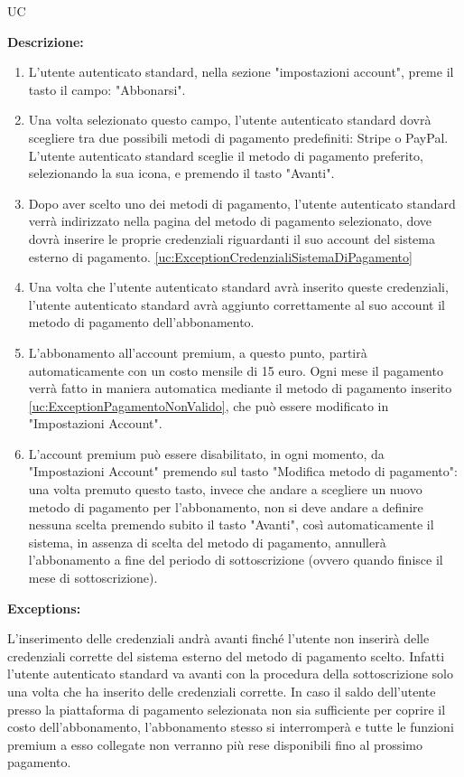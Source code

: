 \begin{listaPersonale}{UC}
\begin{listaPersonale2}[UC] {}
        \textbf{Descrizione:}
        \begin{enumerate}
            \item L'utente autenticato standard, nella sezione "impostazioni account", preme il tasto il campo: "Abbonarsi".
            \item Una volta selezionato questo campo, l'utente autenticato standard dovrà scegliere tra due possibili metodi di pagamento predefiniti: Stripe o PayPal. L'utente autenticato standard sceglie il metodo di pagamento preferito, selezionando la sua icona, e premendo il tasto "Avanti".
            \item Dopo aver scelto uno dei metodi di pagamento, l'utente autenticato standard verrà indirizzato nella pagina del metodo di pagamento selezionato, dove dovrà inserire le proprie credenziali riguardanti il suo account del sistema esterno di pagamento. \ref{uc:ExceptionCredenzialiSistemaDiPagamento}
            \item Una volta che l'utente autenticato standard avrà inserito queste credenziali, l'utente autenticato standard avrà aggiunto correttamente al suo account il metodo di pagamento dell'abbonamento.
            \item L'abbonamento all'account premium, a questo punto, partirà automaticamente con un costo mensile di 15 euro. Ogni mese il pagamento verrà fatto in maniera automatica mediante il metodo di pagamento inserito \ref{uc:ExceptionPagamentoNonValido}, che può essere modificato in "Impostazioni Account".
            \item L'account premium può essere disabilitato, in ogni momento, da "Impostazioni Account" premendo sul tasto "Modifica metodo di pagamento": una volta premuto questo tasto, invece che andare a scegliere un nuovo metodo di pagamento per l'abbonamento, non si deve andare a definire nessuna scelta premendo subito il tasto "Avanti", così automaticamente il sistema, in assenza di scelta del metodo di pagamento, annullerà l'abbonamento a fine del periodo di sottoscrizione (ovvero quando finisce il mese di sottoscrizione).
        \end{enumerate}

        \textbf{Exceptions:}
        \begin{enumerate}[label=\textbf{[exception \arabic{enumiii}]}, ref= \textbf{[exception \arabic{enumiii}]}]
             L'inserimento delle credenziali andrà avanti finché l'utente non inserirà delle credenziali corrette del sistema esterno del metodo di pagamento scelto. Infatti l'utente autenticato standard va avanti con la procedura della sottoscrizione solo una volta che ha inserito delle credenziali corrette.
             In caso il saldo dell'utente presso la piattaforma di pagamento selezionata non sia sufficiente per coprire il costo dell'abbonamento, l'abbonamento stesso si interromperà e tutte le funzioni premium a esso collegate non verranno più rese disponibili fino al prossimo pagamento.
        \end{enumerate}



\end{listaPersonale2}
\end{listaPersonale}
